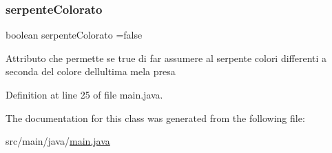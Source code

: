\subsubsection{\texorpdfstring{serpente\+Colorato}{serpenteColorato}}
{\footnotesize\ttfamily boolean serpente\+Colorato =false\hspace{0.3cm}{\ttfamily [private]}}

Attributo che permette se true di far assumere al serpente colori differenti a seconda del colore dell\textquotesingle{}ultima mela presa 

Definition at line 25 of file main.\+java.



The documentation for this class was generated from the following file\+:\begin{DoxyCompactItemize}
\item 
src/main/java/\mbox{\hyperlink{main_8java}{main.\+java}}\end{DoxyCompactItemize}
